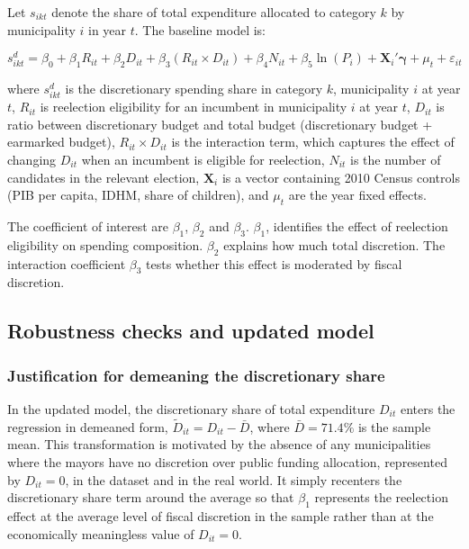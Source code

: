 \documentclass[12pt, a4paper]{article}
\begin{document}
Let $s_{ikt}$ denote the share of total expenditure allocated to category $k$ by municipality $i$ in year $t$. The baseline model is:

\begin{equation*}
    s^{d}_{ikt} = \beta_0
                + \beta_1 R_{it}
                + \beta_2 D_{it}
                + \beta_3 (R_{it} \times D_{it})
                + \beta_4 N_{it}
                + \beta_5 \ln(P_i)
                + \mathbf{X}_i'\boldsymbol{\gamma}
                + \mu_t
                + \varepsilon_{it}
\end{equation*}

\noindent where $s^{d}_{ikt}$ is the discretionary spending share in category $k$, municipality $i$ at year $t$, $R_{it}$ is reelection eligibility for an incumbent in municipality $i$ at year $t$, $D_{it}$ is ratio between discretionary budget and total budget (discretionary budget + earmarked budget), $R_{it} \times D_{it}$ is the interaction term, which captures the effect of changing $D_{it}$ when an incumbent is eligible for reelection, $N_{it}$ is the number of candidates in the relevant election, $\mathbf{X}_i$ is a vector containing 2010 Census controls (PIB per capita, IDHM, share of children), and $\mu_t$ are the year fixed effects.

The coefficient of interest are $\beta_1$, $\beta_2$ and $\beta_3$. $\beta_1$, identifies the effect of reelection eligibility on spending composition. $\beta_2$ explains how much total discretion. The interaction coefficient $\beta_3$ tests whether this effect is moderated by fiscal discretion.

\subsection*{Robustness checks and updated model}

\subsubsection*{Justification for demeaning the discretionary share}

In the updated model, the discretionary share of total expenditure $D_{it}$ enters the regression in demeaned form, $\tilde{D}_{it} = D_{it} - \bar{D}$, where $\bar{D} = 71.4\%$ is the sample mean. This transformation is motivated by the absence of any municipalities where the mayors have no discretion over public funding allocation, represented by $D_{it} = 0$, in the dataset and in the real world. It simply recenters the discretionary share term around the average so that $\beta_1$ represents the reelection effect at the average level of fiscal discretion in the sample rather than at the economically meaningless value of $D_{it} = 0$.
\end{document}
